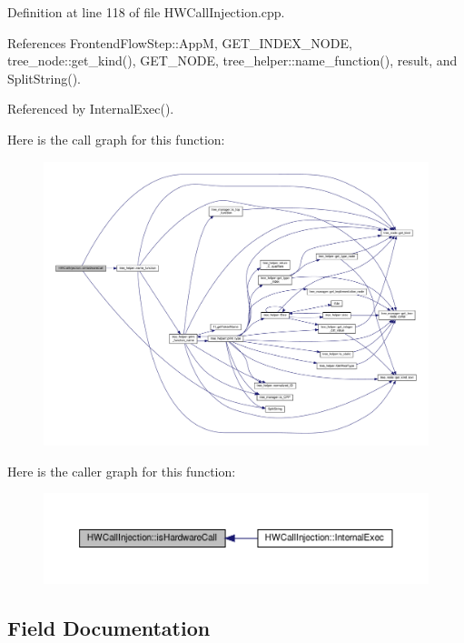 Definition at line 118 of file H\+W\+Call\+Injection.\+cpp.



References Frontend\+Flow\+Step\+::\+AppM, G\+E\+T\+\_\+\+I\+N\+D\+E\+X\+\_\+\+N\+O\+DE, tree\+\_\+node\+::get\+\_\+kind(), G\+E\+T\+\_\+\+N\+O\+DE, tree\+\_\+helper\+::name\+\_\+function(), result, and Split\+String().



Referenced by Internal\+Exec().

Here is the call graph for this function\+:
\nopagebreak
\begin{figure}[H]
\begin{center}
\leavevmode
\includegraphics[width=350pt]{d8/d90/classHWCallInjection_a360d7a448f3af6dcb63c4766305531e7_cgraph}
\end{center}
\end{figure}
Here is the caller graph for this function\+:
\nopagebreak
\begin{figure}[H]
\begin{center}
\leavevmode
\includegraphics[width=350pt]{d8/d90/classHWCallInjection_a360d7a448f3af6dcb63c4766305531e7_icgraph}
\end{center}
\end{figure}


\subsection{Field Documentation}
\mbox{\label{classHWCallInjection_abed1fda434c2003c2b776faac294ac90}} 
